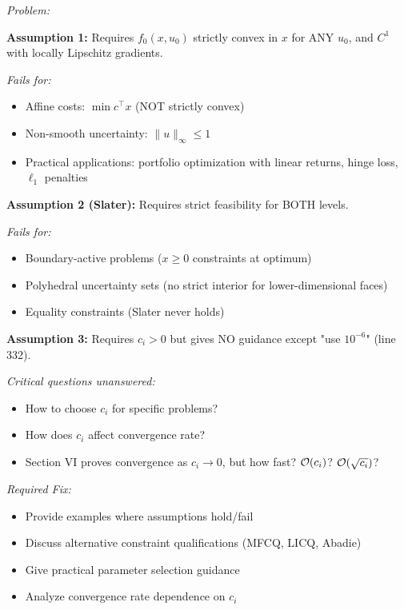 \documentclass[journal,twoside,web]{ieeecolor}
\begin{document}
\begin{enumerate}
\textit{Problem:}

\textbf{Assumption 1:} Requires $f_0(x,u_0)$ strictly convex in $x$ for ANY $u_0$, and $C^1$ with locally Lipschitz gradients.

\textit{Fails for:}
\begin{itemize}
\item Affine costs: $\min c^\top x$ (NOT strictly convex)
\item Non-smooth uncertainty: $\|u\|_\infty \leq 1$
\item Practical applications: portfolio optimization with linear returns, hinge loss, $\ell_1$ penalties
\end{itemize}

\textbf{Assumption 2 (Slater):} Requires strict feasibility for BOTH levels.

\textit{Fails for:}
\begin{itemize}
\item Boundary-active problems ($x \geq 0$ constraints at optimum)
\item Polyhedral uncertainty sets (no strict interior for lower-dimensional faces)
\item Equality constraints (Slater never holds)
\end{itemize}

\textbf{Assumption 3:} Requires $c_i > 0$ but gives NO guidance except "use $10^{-6}$" (line 332).

\textit{Critical questions unanswered:}
\begin{itemize}
\item How to choose $c_i$ for specific problems?
\item How does $c_i$ affect convergence rate?
\item Section VI proves convergence as $c_i\to 0$, but how fast? ${\cal O}(c_i)$? ${\cal O}(\sqrt{c_i})$?
\end{itemize}

\textit{Required Fix:}
\begin{itemize}
\item Provide examples where assumptions hold/fail
\item Discuss alternative constraint qualifications (MFCQ, LICQ, Abadie)
\item Give practical parameter selection guidance
\item Analyze convergence rate dependence on $c_i$
\end{itemize}

\end{enumerate}
\end{document}
